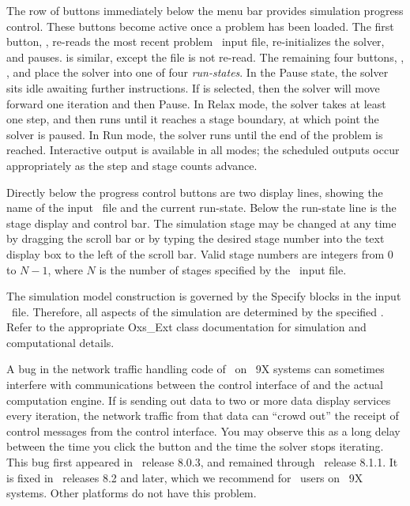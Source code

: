 The row of buttons immediately below the menu bar provides simulation
progress control.  These buttons become active once a problem has
been loaded.  The first button, , re-reads the most recent
problem \MIF\ input file, re-initializes the solver, and pauses.
 is similar, except the file is not re-read.  The remaining
four buttons, ,
,  and  place the solver into one of
four \textit{run-states}.  In the Pause state, the solver sits idle
awaiting further instructions.  If  is selected, then the
solver will move forward one iteration and then Pause.  In Relax mode,
the solver takes at least one step, and then runs until it reaches a
stage boundary, at which point the solver is paused.  In Run mode, the
solver runs until the end of the problem is reached.  Interactive output
is available in all modes; the scheduled outputs occur appropriately as
the step and stage counts advance.

Directly below the progress control buttons are two display lines,
showing the name of the input \MIF\ file and the current run-state.
Below the run-state  line is the stage display and control
bar.  The simulation stage may be changed at any time by dragging the
scroll bar or by typing the desired stage number into the text display
box to the left of the scroll bar.  Valid stage numbers are integers
from 0 to $N-1$, where $N$ is the number of stages specified by the
\MIF\ input file.

The simulation model construction is governed by the Specify blocks in
the input \MIF\ file.  Therefore, all aspects of the simulation are
determined by the specified
.
Refer to the appropriate Oxs\_Ext class documentation for simulation and
computational details.

A bug in the network traffic handling code of
\Tcl\ on \Windows~9X systems can sometimes interfere
with communications between the control interface of  and
the actual computation engine.  If  is sending out data
to two or more data display services every iteration, the network
traffic from that data can ``crowd out'' the receipt of
control messages from the control interface.  You may observe this as a
long delay between the time you click the  button and the
time the solver stops iterating.  This bug first appeared in \Tcl\
release 8.0.3, and remained through \Tcl\ release 8.1.1.  It is fixed in
\Tcl\ releases 8.2 and later, which we recommend for \OOMMF\ users on
\Windows~9X systems.  Other platforms do not have this problem.

